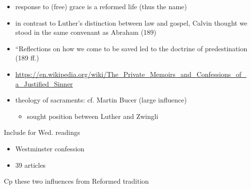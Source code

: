 \begin{frame}[label=sec-2-6]{}
\begin{itemize}[<+->]
\item response to (free) grace is a \alert{reformed} life (thus the name)
\item in contrast to Luther's distinction between law and gospel, Calvin thought we stood in the same convenant as Abraham (189)
\item ``Reflections on how we come to be saved led to the doctrine of predestination (189 ff.)
\item \url{https://en.wikipedia.org/wiki/The_Private_Memoirs_and_Confessions_of_a_Justified_Sinner}
\item theology of sacraments: cf. \alert{Martin Bucer} (large influence)
\begin{itemize}
\item sought position between Luther and Zwingli
\end{itemize}
\end{itemize}
\end{frame}
\begin{frame}[label=sec-2-7]{Include for Wed. readings}
\begin{itemize}
\item Westminster confession
\item 39 articles
\end{itemize}
\begin{block}{Cp these two influences from Reformed tradition}
\end{block}
\end{frame}

